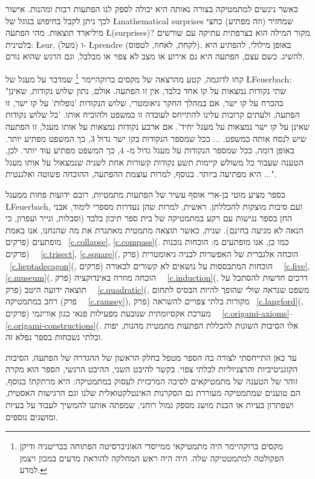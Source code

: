 כאשר ניגשים למתמטיקה בצורה נאותה היא יכולה לספק לנו הפתעות רבות ומהנות. אישור לכך ניתן לקבל בחיפוש בגוגל של 
\L{mathematical surprises}
שמחזיר (וזה מפתיע) כחצי מיליארד תוצאות. מהי הפתעה
\L{(surprises)}?
מקור המילה הוא בצרפתית עתיקה עם שורשים בלטינית: 
\L{sur},
(מעל) ו-%
\L{prendre}
(לקחת, לאחוז, לטפוס). באופן מילולי, להפתיע היא להשיג. כשם עצם, הפתעה היא גם אירוע או מצב לא צפוי או מבלבל, וגם הרגש שהוא גורם.


קחו לדוגמה, קטע מהרצאה של מקסים ברוקהיימר%
\footnote{מקסים ברוקהיימר היה מתמטיקאי ממייסדי האוניברסיטה הפתוחה בבריטניה ודיקן הפקולטה למתמטטיקה שלה. היה היה ראש המחלקה להוראת מדעים במכון ויצמן למדע.}
שמדבר על מעגל של
\L{Feuerbach}:
"שתי נקודות נמצאות על קו אחד בלבד, אין זו הפתעה. אולם, נתון שלוש נקודות, שאינן בהכרח על קו ישר, אם במהלך החקר גיאומטרי, שלוש הנקודות 'נופלות' על קו ישר, זו הפתעה, ולעתים קרובות עלינו להתייחס לעובדה זו כמשפט ולהוכיח אותו. 'כל שלוש נקודות שאינן על קו ישר נמצאות על מעגל יחיד'. אם ארבע נקודות נמצאות על אותו מעגל, זו הפתעה שיש לנסח אותה כמשפט.
$\ldots$
ככל שמספר הנקודות בקו ישר גדול $3$, כך המשפט מפתיע יותר. באופן דומה, ככל שמספר הנקודות על מעגל גדול מ-%
$4$,
כך המשפט מפתיע עוד יותר. לכן, הטענה שעבור כל משולש קיימות תשע נקודות קשורות אחת לשניה שנמצאול על אותו מעגל  
$\ldots$
היא מפתיעה ביותר. בנוסף, למרות עוצמת ההפתעה, ההוכחה פשוטה ואלגנטית".

בספר מציע מוטי בן-ארי אוסף עשיר של הפתעות מתמטיות, רובם ידועות פחות ממעגל 
\L{Feuerbach},
ועם סיבות מוצקות להכללתן. ראשית, למרות שהן נעדרות מספרי לימוד, אבני החן בספר נגישות עם רקע במתמטיקה של בית ספר תיכון בלבד (וסבלות, ונייר ועפרון, כי הנאה לא מגיעה בחינם). שנית, כאשר תוצאה מתמטית מאתגרת את מה שהנחנו, אנו באמת מופתעים (פרקים~%
\ref{c.collapse}, \ref{c.compass}(.
כמו כן, אנו מופתעים מ: הוכחות נובנות (פרקים~%
~\ref{c.trisect}, \ref{c.square}(,
הוכחה אלגברית של האפשרות לבניה גיאומטרית (פרק~%
~\ref{c.heptadecagon}(,
הוכחות המתבססות על נושאים לא קשורים לכאורה (פרקים~%
~\ref{c.five}, \ref{c.museum}(,
הוכחה מוזרה באינדוקציה (פרק~%
~\ref{c.induction}(,
דרכים חדשות להסתכל על תוצאה ידועה היטב (פרק~%
~\ref{c.quadratic}(,
משפט שנראה שולי שהופך להיות הבסיס לתחום רחב במתמטיקה (פרק~%
~\ref{c.ramsey}),
מקורות בלתי צפויים להשראה (פרק~%
\ref{c.langford}(,
מערכת אקסיומתית שנובעת מפעילות פנאי כגון אוריגמי (פרקים~%
~\ref{c.origami-axioms}--\ref{c.origami-constructions}(.
אלו הסיבות השונות להכללת הפתעות מתמטית מהנות, יפות ובלתי נשכחות בספר נפלא זה.

עד כאן התייחסתי לצורה בה הספר מטפל בחלק הראשון של ההגדרה של הפתעה, הסיבות הקוגניטיביות והרצניוליות לבלתי צפוי. בקשר להיבט השני, ההיבט הרגשי, הספר הוא מקרה זוהר של הטענה של מתמטיקאים לסיבה המרכזית לעסוק במתמטיקה: היא מרתקת! בנוסף, הם טוענים שמתמטיקה מעוררת גם הסקרנות האינטלקטואלית שלנו וגם הרגישות האסטית, ושפתרון בעיות או הבנת מושג מספק גמול רוחני, שמפתה אותנו להמשיך לעבוד על בעיות ומושגים נוספים.

